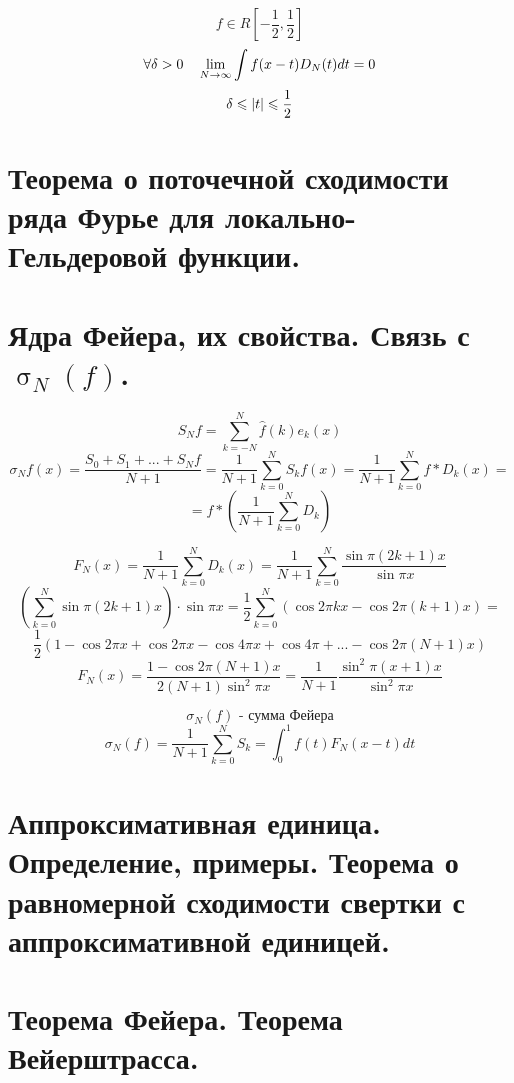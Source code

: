 \documentclass[matan, 12pt, fleqn]{subfiles}
\begin{document}
\begin{Lemma}
    \[f \in R[-\frac{1}{2}, \frac{1}{2}]\]    
    \[\forall \delta > 0 \quad \lim_{N \to \infty} \int f(x - t)D_N(t)dt = 0 \]
    \[\delta \leqslant \left|t\right| \leqslant \frac{1}{2}\]
\end{Lemma}

\newpage
\section{Теорема о поточечной сходимости ряда Фурье для локально-Гельдеровой функции.}


\newpage
\section{Ядра Фейера, их свойства. Связь с $\upsigma_N(f)$.}

\[S_N f = \sum_{k = -N}^N \hat{f}(k)e_k(x) \]
\[\sigma_N f(x) = \frac{S_0 + S_1 + ... + S_N f}{N + 1} = \frac{1}{N + 1} 
\sum_{k = 0}^N S_k f(x) = \frac{1}{N + 1} \sum_{k = 0}^N f * D_k(x) = \]
\[= f * (\frac{1}{N  + 1}\sum_{k = 0}^N D_k)\]

\begin{Definition} 
    \[F_N(x) = \frac{1}{N  + 1} \sum_{k = 0}^N D_k (x) = \frac{1}{N + 1} 
    \sum_{k = 0}^N \frac{\sin \pi (2k + 1)x}{\sin \pi x} \]
    \[(\sum_{k = 0}^N \sin \pi (2k + 1)x) \cdot \sin \pi x = \frac{1}{2} 
    \sum_{k = 0}^N (\cos 2\pi kx - \cos 2\pi (k + 1)x) =  \]
    \[\frac{1}{2} ( 1 - \cos 2\pi x + \cos 2\pi x - \cos 4\pi x + \cos 4 \pi + ... - 
    \cos 2\pi (N + 1)x)\]
    \[F_N(x) = \frac{1 - \cos 2\pi(N + 1)x}{2(N + 1)\sin^2 \pi x} = 
    \frac{1}{N + 1} \frac{\sin^2 \pi (x + 1)x}{\sin^2 \pi x}\]
\end{Definition}

\[\sigma_N(f) \text{ - сумма Фейера}\]
\[
    \sigma_N(f) = \frac{1}{N + 1} \sum_{k = 0}^N S_k = \int_0^1 f(t) F_{N} (x-t)dt  
\]

\newpage
\section{Аппроксимативная единица. Определение, примеры. Теорема о равномерной сходимости свертки с аппроксимативной единицей.}


\newpage
\section{Теорема Фейера. Теорема Вейерштрасса.}
\end{document}
